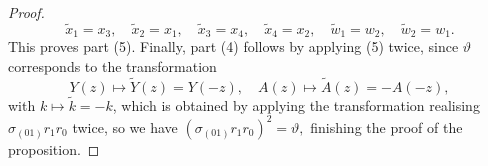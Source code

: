 \documentclass[a4paper,reqno]{amsart}
\numberwithin{equation}{section}
\numberwithin{equation}{section}
\begin{document}
\begin{proof}
\begin{equation*}
        \widetilde{x}_1=x_3, \quad
        \widetilde{x}_2=x_1,\quad 
        \widetilde{x}_3=x_4, \quad 
        \widetilde{x}_4=x_2,\quad 
        \widetilde{w}_1=w_2,\quad
         \widetilde{w}_2=w_1.
\end{equation*}
This proves part (5). 
Finally, part (4) follows by applying (5) twice,  since $\vartheta$ corresponds to the transformation
\begin{equation*}
    Y(z)\mapsto\widetilde{Y}(z)=Y(-z),\quad A(z)\mapsto \widetilde{A}(z)=- A(-z),
\end{equation*}
with $k\mapsto \widetilde{k}=-k$, which is obtained by applying the transformation realising $\sigma_{(01)}r_1r_0$ twice, so we have
$(\sigma_{(01)}r_1r_0)^2=\vartheta,$
finishing the proof of the proposition.
\end{proof}
\end{document}
